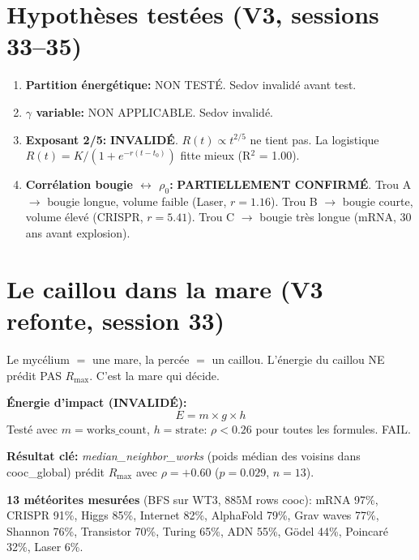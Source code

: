 \documentclass[11pt,a4paper]{article}
\begin{document}
\section{Hypoth\`eses test\'ees (V3, sessions 33--35)}

\begin{enumerate}
\item \textbf{Partition \'energ\'etique:} NON TEST\'E. Sedov invalid\'e avant test.
\item \textbf{$\gamma$ variable:} NON APPLICABLE. Sedov invalid\'e.
\item \textbf{Exposant 2/5:} \textbf{INVALID\'E}. $R(t) \propto t^{2/5}$ ne tient pas.
  La logistique $R(t) = K/(1+e^{-r(t-t_0)})$ fitte mieux (R$^2$ = 1.00).
\item \textbf{Corr\'elation bougie $\leftrightarrow$ $\rho_0$:} \textbf{PARTIELLEMENT CONFIRM\'E}.
  Trou A $\to$ bougie longue, volume faible (Laser, $r=1.16$).
  Trou B $\to$ bougie courte, volume \'elev\'e (CRISPR, $r=5.41$).
  Trou C $\to$ bougie tr\`es longue (mRNA, 30 ans avant explosion).
\end{enumerate}

\section{Le caillou dans la mare (V3 refonte, session 33)}

Le myc\'elium $=$ une mare, la perc\'ee $=$ un caillou.
L'\'energie du caillou NE pr\'edit PAS $R_{\max}$. C'est la mare qui d\'ecide.

\textbf{\'Energie d'impact (INVALID\'E):}
\begin{equation}
E = m \times g \times h
\end{equation}
Test\'e avec $m = \text{works\_count}$, $h = \text{strate}$:
$\rho < 0.26$ pour toutes les formules. FAIL.

\textbf{R\'esultat cl\'e:} \textit{median\_neighbor\_works} (poids m\'edian des voisins
dans cooc\_global) pr\'edit $R_{\max}$ avec $\rho = +0.60$ ($p = 0.029$, $n = 13$).

\textbf{13 m\'et\'eorites mesur\'ees} (BFS sur WT3, 885M rows cooc):
mRNA 97\%, CRISPR 91\%, Higgs 85\%, Internet 82\%, AlphaFold 79\%,
Grav waves 77\%, Shannon 76\%, Transistor 70\%, Turing 65\%, ADN 55\%,
G\"odel 44\%, Poincar\'e 32\%, Laser 6\%.
\end{document}
